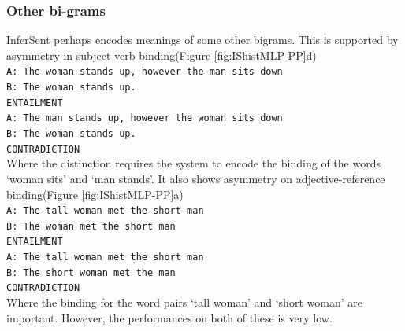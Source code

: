 \documentclass[10pt,letterpaper]{article}
\begin{document}
\subsubsection{Other bi-grams}
InferSent perhaps encodes meanings of some other bigrams. This is supported by asymmetry in subject-verb binding(Figure \ref{fig:IShistMLP-PP}d) \\
{\tt A: The woman stands up, however the man sits down \\ B: The woman stands up. \\ ENTAILMENT \\}{\tt A: The man stands up, however the woman sits down \\ B: The woman stands up. \\ CONTRADICTION}\\
Where the distinction requires the system to encode the binding of the words `woman sits' and `man stands'. It also shows asymmetry on adjective-reference binding(Figure \ref{fig:IShistMLP-PP}a)\\
{\tt A: The tall woman met the short man \\ B: The woman met the short man \\ ENTAILMENT \\}{\tt A: The tall woman met the short man \\ B: The short woman met the man \\ CONTRADICTION}\\
Where the binding for the word pairs `tall woman' and `short woman' are important. However, the performances on both of these is very low.
\end{document}
